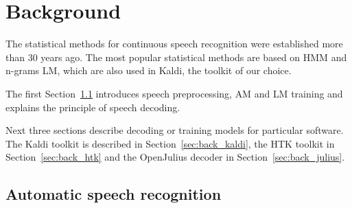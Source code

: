\chapter{Background}
\label{cha:background}

% 
% 

The statistical methods for continuous speech recognition were established more than 30 years ago. 
The most popular statistical methods are based on \ac{HMM} and n-grams \ac{LM},
which are also used in Kaldi, the toolkit of our choice.

The first Section~\ref{sec:back_asr} introduces speech preprocessing, \ac{AM} and \ac{LM} training
and explains the principle of speech decoding.

Next three sections describe decoding or training models for particular software.
The Kaldi toolkit is described in Section~\ref{sec:back_kaldi}, 
the \ac{HTK} toolkit in Section~\ref{sec:back_htk} and 
the OpenJulius decoder in Section~\ref{sec:back_julius}.

\section{Automatic speech recognition}
\label{sec:back_asr}



